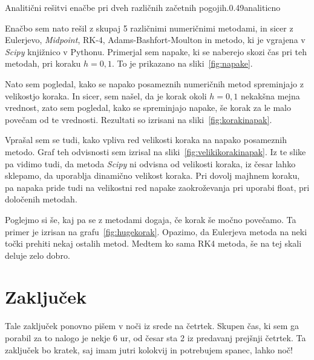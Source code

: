 \documentclass{porocilo}
\begin{document}
\begin{multifig}{2}{Analitični rešitvi enačbe pri dveh različnih začetnih pogojih.}{0.49}{analiticno}
\end{multifig}

Enačbo sem nato rešil z skupaj 5 različnimi numeričnimi metodami, in sicer z Eulerjevo, \textit{Midpoint}, RK-4, Adams-Bashfort-Moulton in metodo, ki je vgrajena v \textit{Scipy} knjižnico v Pythonu. Primerjal sem napake, ki se naberejo skozi čas pri teh metodah, pri koraku $h = 0,1$. To je prikazano na sliki~\ref{fig:napake}.


Nato sem pogledal, kako se napako posameznih numeričnih metod spreminjajo z velikostjo koraka. In sicer, sem našel, da je korak okoli $h = 0,1$ nekakšna mejna vrednost, zato sem pogledal, kako se spreminjajo napake, še korak za le malo povečam od te vrednosti. Rezultati so izrisani na sliki~\ref{fig:korakinapak}.


Vprašal sem se tudi, kako vpliva red velikosti koraka na napako posameznih metodo. Graf teh odvisnosti sem izrisal na sliki~\ref{fig:velikikorakinapak}. Iz te slike pa vidimo tudi, da metoda \textit{Scipy} ni odvisna od velikosti koraka, iz česar lahko sklepamo, da uporablja dinamično velikost koraka. Pri dovolj majhnem koraku, pa napaka pride tudi na velikostni red napake zaokroževanja pri uporabi float, pri določenih metodah.


Poglejmo si še, kaj pa se z metodami dogaja, če korak še močno povečamo. Ta primer je izrisan na grafu~\ref{fig:hugekorak}. Opazimo, da Eulerjeva metoda na neki točki prehiti nekaj ostalih metod. Medtem ko sama RK4 metoda, še na tej skali deluje zelo dobro.


\section{Zaključek}
Tale zaključek ponovno pišem v noči iz srede na četrtek. Skupen čas, ki sem ga porabil za to nalogo je nekje 6 ur, od česar sta 2 iz predavanj prejšnji četrtek. Ta zaključek bo kratek, saj imam jutri kolokvij in potrebujem spanec, lahko noč!
\end{document}
